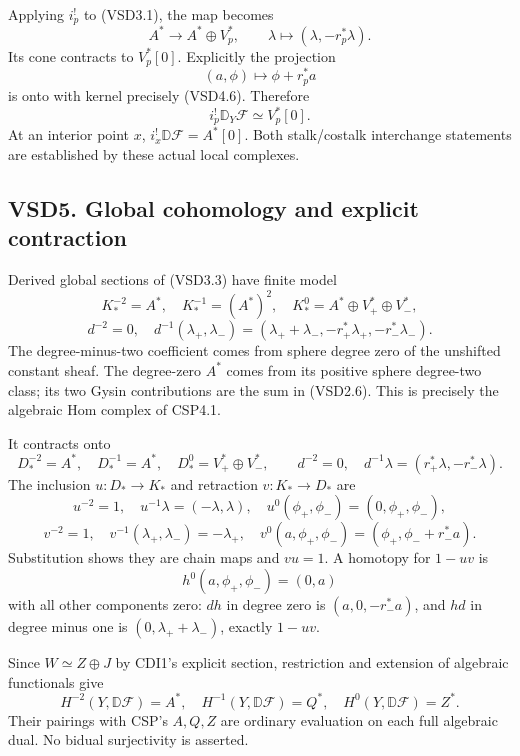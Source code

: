 Applying \(i_p^!\) to (VSD3.1), the map becomes \[
A^*\to A^*\oplus V_p^*,\qquad
\lambda\mapsto(\lambda,-r_p^*\lambda).
\tag{VSD4.6}
\] Its cone contracts to \(V_p^*[0]\). Explicitly the projection \[
(a,\phi)\longmapsto\phi+r_p^*a
\tag{VSD4.7}
\] is onto with kernel precisely (VSD4.6). Therefore \[
\boxed{i_p^!\mathbb D_Y\mathscr F\simeq V_p^*[0].}
\tag{VSD4.8}
\] At an interior point \(x\), \(i_x^!\mathbb D\mathscr F=A^*[0]\). Both
stalk/costalk interchange statements are established by these actual
local complexes.

\subsection{VSD5. Global cohomology and explicit
contraction}\label{vsd5.-global-cohomology-and-explicit-contraction}

Derived global sections of (VSD3.3) have finite model \[
K_*^{-2}=A^*,\quad K_*^{-1}=(A^*)^2,\quad K_*^0=A^*\oplus V_+^*\oplus V_-^*,
\] \[
d^{-2}=0,\quad
d^{-1}(\lambda_+,\lambda_-)
=(\lambda_++\lambda_-,-r_+^*\lambda_+,-r_-^*\lambda_-).
\tag{VSD5.1}
\] The degree-minus-two coefficient comes from sphere degree zero of the
unshifted constant sheaf. The degree-zero \(A^*\) comes from its
positive sphere degree-two class; its two Gysin contributions are the
sum in (VSD2.6). This is precisely the algebraic Hom complex of CSP4.1.

It contracts onto \[
D_*^{-2}=A^*,\quad D_*^{-1}=A^*,\quad D_*^0=V_+^*\oplus V_-^*,\qquad
d^{-2}=0,\quad d^{-1}\lambda=(r_+^*\lambda,-r_-^*\lambda).
\tag{VSD5.2}
\] The inclusion \(u:D_*\to K_*\) and retraction \(v:K_*\to D_*\) are \[
u^{-2}=1,\quad u^{-1}\lambda=(-\lambda,\lambda),\quad
u^0(\phi_+,\phi_-)=(0,\phi_+,\phi_-),
\tag{VSD5.3}
\] \[
v^{-2}=1,\quad v^{-1}(\lambda_+,\lambda_-)=-\lambda_+,\quad
v^0(a,\phi_+,\phi_-)=(\phi_+,\phi_-+r_-^*a).
\tag{VSD5.4}
\] Substitution shows they are chain maps and \(vu=1\). A homotopy for
\(1-uv\) is \[
h^0(a,\phi_+,\phi_-)=(0,a)
\tag{VSD5.5}
\] with all other components zero: \(dh\) in degree zero is
\((a,0,-r_-^*a)\), and \(hd\) in degree minus one is
\((0,\lambda_++\lambda_-)\), exactly \(1-uv\).

Since \(W\simeq Z\oplus J\) by CDI1's explicit section, restriction and
extension of algebraic functionals give \[
\boxed{H^{-2}(Y,\mathbb D\mathscr F)=A^*,\quad
H^{-1}(Y,\mathbb D\mathscr F)=Q^*,\quad
H^0(Y,\mathbb D\mathscr F)=Z^*.}
\tag{VSD5.6}
\] Their pairings with CSP's \(A,Q,Z\) are ordinary evaluation on each
full algebraic dual. No bidual surjectivity is asserted.

